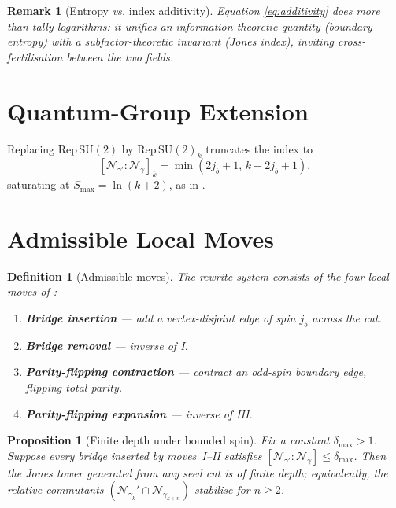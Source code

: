 \documentclass[11pt]{article}
\newtheorem{definition}{Definition}[section]
\newtheorem{proposition}{Proposition}[section]
\newtheorem{remark}{Remark}[section]
\begin{document}
\begin{remark}[Entropy \emph{vs.} index additivity]\label{rem:additivity}
Equation \eqref{eq:additivity} does more than tally logarithms:
it unifies an \emph{information-theoretic} quantity 
(boundary entropy) with a \emph{subfactor-theoretic} invariant 
(Jones index), inviting cross-fertilisation between the two fields.
\end{remark}

\section{Quantum-Group Extension}
Replacing $\mathrm{Rep}\,\mathrm{SU}(2)$ by $\mathrm{Rep}\,\mathrm{SU}(2)_k$
truncates the index to
\[
  [\mathcal N_{\gamma'}:\mathcal N_{\gamma}]_{k}
  =\min\!(2j_b+1,\,k-2j_b+1),
\]
saturating at $S_{\max}=\ln(k+2)$, as in \cite{EntropyMono}.

\section{Admissible Local Moves}

\begin{definition}[Admissible moves]\label{def:moves}
The rewrite system consists of the four local moves of \cite{EntropyMono}:
\begin{enumerate}
\item[\textbf{I.}] \textbf{Bridge insertion} — add a vertex-disjoint edge of spin
      $j_b$ across the cut.
\item[\textbf{II.}] \textbf{Bridge removal} — inverse of I.
\item[\textbf{III.}] \textbf{Parity-flipping contraction} — contract an odd-spin
      boundary edge, flipping total parity.
\item[\textbf{IV.}] \textbf{Parity-flipping expansion} — inverse of III.
\end{enumerate}
\end{definition}

\begin{proposition}[Finite depth under bounded spin]\label{prop:finitedepth}
Fix a constant $\delta_{\max}\!>\!1$.  
Suppose every bridge inserted by moves~I–II satisfies 
$[\mathcal N_{\gamma'}:\mathcal N_{\gamma}]\le \delta_{\max}$.  
Then the Jones tower generated from any seed cut is of finite depth; 
equivalently, the relative commutants 
$(\mathcal N_{\gamma_k}'\!\cap\mathcal N_{\gamma_{k+n}})$ stabilise for $n\ge 2$.
\end{proposition}
\end{document}
